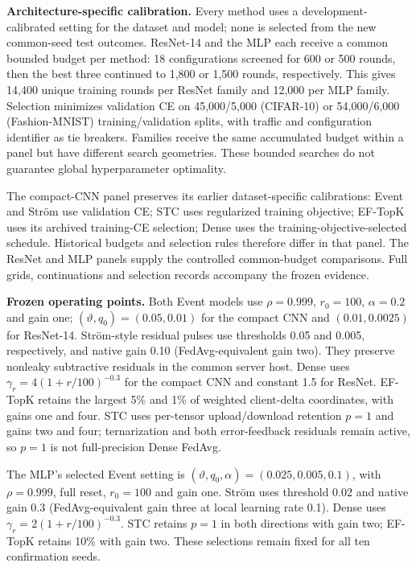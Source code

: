 \documentclass[conference]{IEEEtran}
\newcommand{\coreColor}{\color{coreblue}}
\newcommand{\coreRev}[1]{{\coreColor #1}}
\newcommand{\mlpColor}{\color{mlporange}}
\newcommand{\mlpRev}[1]{{\mlpColor #1}}
\begin{document}
\mlpRev{\textbf{Architecture-specific calibration.}
Every method uses a development-calibrated setting for the dataset and model;
none is selected from the new common-seed test outcomes. ResNet-14 and the MLP
each receive a common bounded budget per method: 18 configurations screened
for 600 or 500 rounds, then the best three continued to 1,800 or 1,500 rounds,
respectively. This gives 14,400 unique training rounds per ResNet family and
12,000 per MLP family. Selection minimizes validation CE on 45,000/5,000
(CIFAR-10) or 54,000/6,000 (Fashion-MNIST) training/validation splits, with
traffic and configuration identifier as tie breakers. Families receive the
same accumulated budget within a panel but have different search geometries.
These bounded searches do not guarantee global hyperparameter optimality.}

\mlpRev{The compact-CNN panel preserves its earlier dataset-specific
calibrations: Event and Str\"om use validation CE; STC uses regularized training
objective; EF-TopK uses its archived training-CE selection; Dense uses the
training-objective-selected schedule. Historical budgets and selection rules
therefore differ in that panel. The ResNet and MLP panels supply the controlled
common-budget comparisons. Full grids, continuations and selection records
accompany the frozen evidence.}

\coreRev{\textbf{Frozen operating points.}
Both Event models use $\rho=0.999$, $r_0=100$, $\alpha=0.2$ and gain one;
$(\vartheta,q_0)=(0.05,0.01)$ for the compact CNN and $(0.01,0.0025)$
for ResNet-14. Str\"om-style residual pulses use thresholds 0.05 and 0.005,
respectively, and native gain 0.10 (FedAvg-equivalent gain two). They preserve
nonleaky subtractive residuals in the common server host. Dense uses
$\gamma_r=4(1+r/100)^{-0.3}$ for the compact CNN and constant 1.5 for ResNet.
EF-TopK retains the largest 5\% and 1\% of weighted client-delta coordinates,
with gains one and four. STC uses per-tensor upload/download retention $p=1$
and gains two and four; ternarization and both error-feedback residuals remain
active, so $p=1$ is not full-precision Dense FedAvg.}

\mlpRev{The MLP's selected Event setting is
$(\vartheta,q_0,\alpha)=(0.025,0.005,0.1)$, with $\rho=0.999$, full reset,
$r_0=100$ and gain one. Str\"om uses threshold 0.02 and native gain 0.3
(FedAvg-equivalent gain three at local learning rate 0.1).
Dense uses $\gamma_r=2(1+r/100)^{-0.3}$.
STC retains $p=1$ in both directions with gain two; EF-TopK retains 10\%
with gain two. These selections remain fixed for all ten confirmation seeds.}
\end{document}
